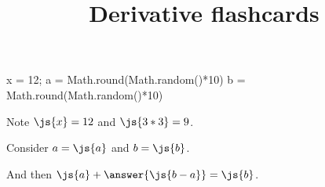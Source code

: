 \documentclass{ximera}
\title{Derivative flashcards}
\begin{document}
\begin{javascript}
  x = 12;
  a = Math.round(Math.random()*10)
  b = Math.round(Math.random()*10)
\end{javascript}

Note $\js{x} = 12$ and $\js{3*3} = 9$.

\begin{problem}
  Consider $a = \js{a}$ and $b = \js{b}$.

  And then $\js{a} + \answer{\js{b-a}} = \js{b}$.
\end{problem}
\end{document}
